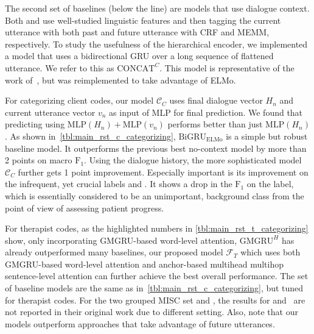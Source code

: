 The second set of baselines (below the line) are models that use
dialogue context.  Both \citet{can2015dialog} and
\citet{tanana2016comparison} use well-studied linguistic features and
then tagging the current utterance with both past and future utterance
with CRF and MEMM, respectively. To study the usefulness of the
hierarchical encoder, we implemented a model that uses a bidirectional
GRU over a long sequence of flattened utterance. We refer to this as
$\text{CONCAT}^{C}$. This model is representative of the work
of~\citet{huang2018modeling}, but was reimplemented to take advantage
of ELMo.





For categorizing client codes, our model $\mathcal{C}_C$ uses final
dialogue vector $H_{n}$ and current utterance vector $v_{n}$ as input
of MLP for final prediction. We found that predicting using
$\text{MLP}(H_{n})+\text{MLP}(v_{n})$ performs better than just
$\text{MLP}({H_{n}})$.  As shown
in~\autoref{tbl:main_rst_c_categorizing}, $\text{BiGRU}_{\text{ELMo}}$
is a simple but robust baseline model. It outperforms the previous
best no-context model by more than 2 points on macro
$\text{F}_{1}$. Using the dialogue history, the more sophisticated
model $\mathcal{C}_{C}$ further gets 1 point improvement. Especially
important is its improvement on the infrequent, yet crucial labels
\CHANGE and \SUSTAIN. It shows a drop in the $\text{F}_{1}$ on the \FN
label, which is essentially considered to be an unimportant,
background class from the point of view of assessing patient progress.
%

For therapist codes, as the highlighted numbers in
\autoref{tbl:main_rst_t_categorizing} show, only incorporating
GMGRU-based word-level attention, $\text{GMGRU}^{H}$ has already
outperformed many baselines, our proposed model $\mathcal{F}_{T}$
which uses both GMGRU-based word-level attention and anchor-based
multihead multihop sentence-level attention can further achieve the
best overall performance. The set of baseline models are the same as
in~\autoref{tbl:main_rst_c_categorizing}, but tuned for therapist
codes. For the two grouped MISC set \MIA and \MIN, the results for
\citet{can2015dialog} and~\citet{tanana2016comparison} are not
reported in their original work due to different setting. Also, note
that our models outperform approaches that take advantage of future
utterances.

